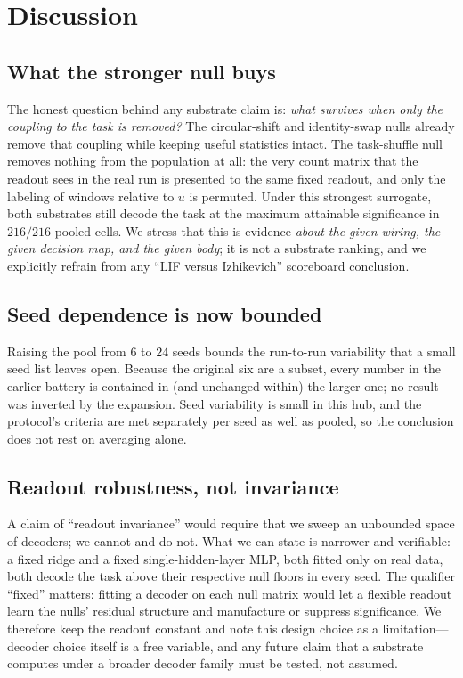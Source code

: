 \documentclass[journal]{IEEEtran}
\begin{document}
\section{Discussion}

\subsection{What the stronger null buys}
The honest question behind any substrate claim is: \emph{what survives when only
the coupling to the task is removed?} The circular-shift and identity-swap nulls
already remove that coupling while keeping useful statistics intact. The
task-shuffle null removes nothing from the population at all: the very count
matrix that the readout sees in the real run is presented to the same fixed
readout, and only the labeling of windows relative to $u$ is permuted. Under this
strongest surrogate, both substrates still decode the task at the maximum
attainable significance in $216/216$ pooled cells. We stress that this is
evidence \emph{about the given wiring, the given decision map, and the given
body}; it is not a substrate ranking, and we explicitly refrain from any ``LIF
versus Izhikevich'' scoreboard conclusion.

\subsection{Seed dependence is now bounded}
Raising the pool from $6$ to $24$ seeds bounds the run-to-run variability that a
small seed list leaves open. Because the original six are a subset, every number
in the earlier battery is contained in (and unchanged within) the larger one; no
result was inverted by the expansion. Seed variability is small in this hub, and
the protocol's criteria are met separately per seed as well as pooled, so the
conclusion does not rest on averaging alone.

\subsection{Readout robustness, not invariance}
A claim of ``readout invariance'' would require that we sweep an unbounded space
of decoders; we cannot and do not. What we can state is narrower and verifiable: a
fixed ridge and a fixed single-hidden-layer MLP, both fitted only on real data,
both decode the task above their respective null floors in every seed. The
qualifier ``fixed'' matters: fitting a decoder on each null matrix would let a
flexible readout learn the nulls' residual structure and manufacture or suppress
significance. We therefore keep the readout constant and note this design choice
as a limitation---decoder choice itself is a free variable, and any future claim
that a substrate computes under a broader decoder family must be tested, not
assumed.
\end{document}
